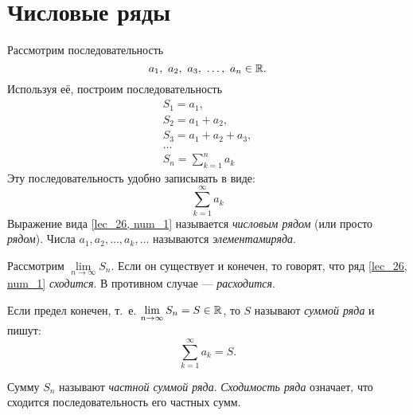 \documentclass[../../main.tex]{subfiles}
\begin{document}
\section{Числовые ряды}
Рассмотрим последовательность
\[a_1,\  a_2,\  a_3,\  \ldots,\  a_n \in \mathbb{R}.\]
Используя её, построим последовательность
\[
\begin{array}{l}
		S_1 = a_1, \\
		S_2 = a_1 + a_2,\\
		S_3 = a_1 + a_2 + a_3,\\
		\dots\\
		S_n = \sum\limits_{k = 1}^na_k
\end{array}		
\]
Эту последовательность удобно записывать в виде:
\begin{equation}
	\label{lec_26, num_1}
	 \sum\limits_{k = 1}^\infty a_k
\end{equation}
Выражение вида \eqref{lec_26, num_1} называется
\emph{числовым рядом} (или просто \emph{рядом}).
Числа  $a_1, a_2,  \ldots, a_k,  \ldots$ называются \emph{элементами ряда}.

Рассмотрим $\lim\limits_{n \to \infty} S_n$. Если он существует и конечен, то говорят, 
что ряд \eqref{lec_26, num_1}  \emph{сходится}. 
В противном случае ---\emph{ расходится}.

Если предел конечен, т.~е. $\lim\limits_{n \to \infty} S_n = S \in \mathbb{R}$, то $S$ 
называют \emph{суммой ряда} и пишут:
\[
	\sum\limits_{k = 1}^\infty a_k=S
.\]

Сумму $S_n$ называют \emph{частной суммой ряда}. 
\emph{Сходимость ряда} означает,
что сходится последовательность его частных сумм.
\end{document}
